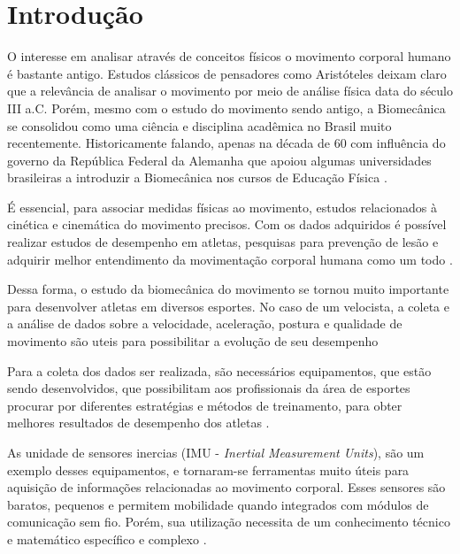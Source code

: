
\chapter[Introdução]{Introdução}

O interesse em analisar através de conceitos físicos o movimento corporal humano é bastante antigo. Estudos clássicos de pensadores como Aristóteles deixam claro que a relevância de analisar o movimento por meio de análise física data do século III a.C. Porém, mesmo com o estudo do movimento sendo antigo, a Biomecânica se consolidou como uma ciência e disciplina acadêmica no Brasil muito recentemente. Historicamente falando, apenas na década de 60 com influência do governo da República Federal da Alemanha que apoiou algumas universidades brasileiras a introduzir a Biomecânica nos cursos de Educação Física \cite{Acquesta2008}.

É essencial, para associar medidas físicas ao movimento,  estudos relacionados à cinética e cinemática do movimento precisos. Com os dados adquiridos é possível realizar estudos de desempenho em atletas, pesquisas para prevenção de lesão e adquirir melhor entendimento da movimentação corporal humana como um todo \cite{mcginnis2013}.

Dessa forma, o estudo da biomecânica do movimento se tornou muito importante para desenvolver atletas em diversos esportes. No caso de um velocista, a coleta e a análise de dados sobre a velocidade, aceleração, postura e qualidade de movimento são uteis para possibilitar a evolução de seu desempenho \cite{okazaki2012}

Para a coleta dos dados ser realizada, são necessários equipamentos, que estão sendo desenvolvidos, que possibilitam aos profissionais da área de esportes procurar por diferentes estratégias e métodos de treinamento, para obter melhores resultados de desempenho dos atletas \cite{okazaki2012}.

As unidade de sensores inercias (IMU - \textit{Inertial Measurement Units}), são um exemplo desses equipamentos, e tornaram-se ferramentas muito úteis para aquisição de informações relacionadas ao movimento corporal. Esses sensores são baratos, pequenos e permitem mobilidade quando integrados com módulos de comunicação sem fio. Porém, sua utilização necessita de um conhecimento técnico e matemático específico e complexo \cite{ober2015}.

